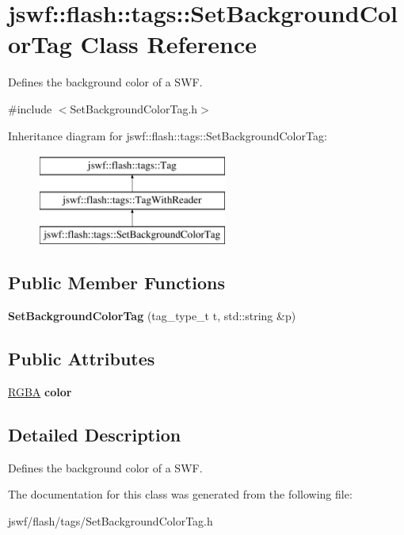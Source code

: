 \hypertarget{classjswf_1_1flash_1_1tags_1_1_set_background_color_tag}{\section{jswf\+:\+:flash\+:\+:tags\+:\+:Set\+Background\+Color\+Tag Class Reference}
\label{classjswf_1_1flash_1_1tags_1_1_set_background_color_tag}
}


Defines the background color of a S\+W\+F.  




{\ttfamily \#include $<$Set\+Background\+Color\+Tag.\+h$>$}

Inheritance diagram for jswf\+:\+:flash\+:\+:tags\+:\+:Set\+Background\+Color\+Tag\+:\begin{figure}[H]
\begin{center}
\leavevmode
\includegraphics[height=3.000000cm]{classjswf_1_1flash_1_1tags_1_1_set_background_color_tag}
\end{center}
\end{figure}
\subsection*{Public Member Functions}
\begin{DoxyCompactItemize}
\item 
\hypertarget{classjswf_1_1flash_1_1tags_1_1_set_background_color_tag_a18c705b84d4028dbc97b5dcaaa9ba68b}{{\bfseries Set\+Background\+Color\+Tag} (tag\+\_\+type\+\_\+t t, std\+::string \&p)}\label{classjswf_1_1flash_1_1tags_1_1_set_background_color_tag_a18c705b84d4028dbc97b5dcaaa9ba68b}

\end{DoxyCompactItemize}
\subsection*{Public Attributes}
\begin{DoxyCompactItemize}
\item 
\hypertarget{classjswf_1_1flash_1_1tags_1_1_set_background_color_tag_ad76998d2ab60bbefcac86cd66466c83d}{\hyperlink{structjswf_1_1flash_1_1_r_g_b_a}{R\+G\+B\+A} {\bfseries color}}\label{classjswf_1_1flash_1_1tags_1_1_set_background_color_tag_ad76998d2ab60bbefcac86cd66466c83d}

\end{DoxyCompactItemize}


\subsection{Detailed Description}
Defines the background color of a S\+W\+F. 

The documentation for this class was generated from the following file\+:\begin{DoxyCompactItemize}
\item 
jswf/flash/tags/Set\+Background\+Color\+Tag.\+h\end{DoxyCompactItemize}
